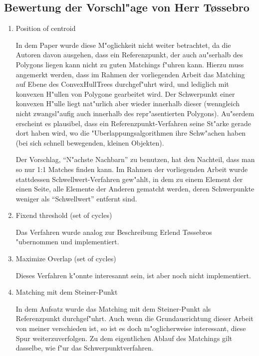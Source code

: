 \subsection{Bewertung der Vorschl"age von Herr  T\o{}ssebro}
\begin{enumerate}
\item Position of centroid

In dem Paper wurde diese M"oglichkeit nicht weiter betrachtet, da die Autoren davon ausgehen, dass ein Referenzpunkt, der auch au"serhalb des Polygons liegen kann nicht zu guten Matchings f"uhren kann. Hierzu muss angemerkt werden, dass im Rahmen der vorliegenden Arbeit das Matching auf Ebene des ConvexHullTrees durchgef"uhrt wird, und lediglich mit konvexen H"ullen von Polygone gearbeitet wird. Der Schwerpunkt einer konvexen H"ulle liegt nat"urlich aber wieder innerhalb dieser (wenngleich nicht zwangsl"aufig auch innerhalb des repr"asentierten Polygons). Au"serdem erscheint es plausibel, dass ein Referenzpunkt-Verfahren seine St"arke gerade dort haben wird, wo die "Uberlappungsalgorithmen ihre Schw"achen haben (bei sich schnell bewegenden, kleinen Objekten).

Der Vorschlag, "`N"achste Nachbarn"' zu benutzen, hat den Nachteil, dass man so nur 1:1 Matches finden kann. Im Rahmen der vorliegenden Arbeit wurde stattdessen Schwellwert-Verfahren gew"ahlt, in dem zu einem Element der einen Seite, alle Elemente der Anderen gematcht werden, deren Schwerpunkte weniger als "`Schwellwert"' entfernt sind. 

\item Fixend threshold (set of cycles)

Das Verfahren wurde analog zur Beschreibung Erlend T\o{}ssebros "ubernommen und implementiert. 

\item Maximize Overlap (set of cycles)

Dieses Verfahren k"onnte interesannt sein, ist aber noch nicht implementiert.

\item Matching mit dem Steiner-Punkt

In dem Aufsatz \cite{AAR} wurde das Matching mit dem Steiner-Punkt als Referenzpunkt durchgef"uhrt. Auch wenn die Grundausrichtung dieser Arbeit von meiner verschieden ist, so ist es doch m"oglicherweise interessant, diese Spur weiterzuverfolgen. Zu dem eigentlichen Ablauf des Matchings gilt dasselbe, wie f"ur das Schwerpunktverfahren.
\end{enumerate}


